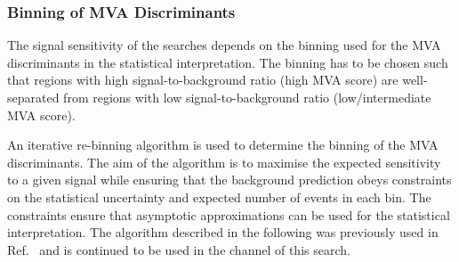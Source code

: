 

\subsubsection{Binning of MVA Discriminants}%
\label{sec:binning_alg}

The signal sensitivity of the searches depends on the binning used for the MVA
discriminants in the statistical interpretation. The binning has to be chosen
such that regions with high signal-to-background ratio (high MVA score) are
well-separated from regions with low signal-to-background ratio
(low/intermediate MVA score).

An iterative re-binning algorithm is used to determine the binning of the MVA
discriminants. The aim of the algorithm is to maximise the expected sensitivity
to a given signal while ensuring that the background prediction obeys
constraints on the statistical uncertainty and expected number of events in each
bin. The constraints ensure that asymptotic approximations can be used for the
statistical interpretation. The algorithm described in the following was
previously used in Ref.~\cite{HIGG-2016-16-witherratum} and is continued to be
used in the \hadhad channel of this search.

